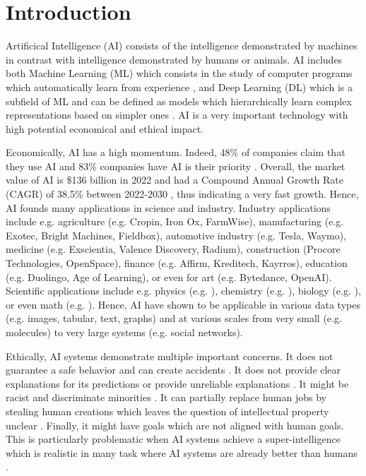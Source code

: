 \chapter{Introduction}
\label{chap:introduction}

Artificical Intelligence (AI) consists of the intelligence demonstrated by machines in contrast with intelligence demonstrated by humans or animals.
AI includes both Machine Learning (ML) which consists in the study of computer programs which automatically learn from experience \citep{Mitchell97}, and Deep Learning (DL) which is a subfield of ML and can be defined as models which hierarchically learn complex representations based on simpler ones \citep{GoodBengCour16}.
AI is a very important technology with high potential economical and ethical impact. 

Economically, AI has a high momentum. Indeed, 48\% of companies claim that they use AI \cite{ai-market-oreilly} and 83\% companies have AI is their priority \cite{ai-market-forbes}. Overall, the market value of AI is \$136 billion in 2022 \cite{ai-market} and had a Compound Annual Growth Rate (CAGR) of 38.5\% between 2022-2030 \cite{ai-market}, thus indicating a very fast growth.
Hence, AI founds many applications in science and industry. 
Industry applications include e.g. agriculture (e.g. Cropin, Iron Ox, FarmWise), manufacturing (e.g. Exotec, Bright Machines, Fieldbox), automotive industry (e.g. Tesla, Waymo), medicine (e.g. Exscientia, Valence Discovery, Radium), construction (Procore Technologies, OpenSpace), finance (e.g. Affirm, Kreditech, Kayrros), education (e.g. Duolingo, Age of Learning), or even for art (e.g. Bytedance, OpenAI).
Scientific applications include e.g. physics (e.g. \cite{gao2022abinitio}), chemistry (e.g. \cite{huang2021abinitio}), biology (e.g. \cite{hetzel2022predicting}), or even math (e.g. \cite{cobbe2021math}).
Hence, AI have shown to be applicable in various data types (e.g. images, tabular, text, graphs) and at various scales from very small (e.g. molecules) to very large systems (e.g. social networks).

Ethically, AI systems demonstrate multiple important concerns.
It does not guarantee a safe behavior and can create accidents \cite{amodei2019problems}.
It does not provide clear explanations for its predictions or provide unreliable explanations \cite{overview-interpretable-ml,interpretable-ml, krishnan2020against}.
It might be racist and discriminate minorities \cite{mehrabi2019fairness}.
It can partially replace human jobs by stealing human creations which leaves the question of intellectual property unclear \cite{moerland2022intellectual, gervais2020intellectual}.
Finally, it might have goals which are not aligned with human goals. This is particularly problematic when AI systems achieve a super-intelligence \cite{bostrom2014superintelligence} which is realistic in many task where AI systems are already better than humans \cite{firestone2020performance}.

